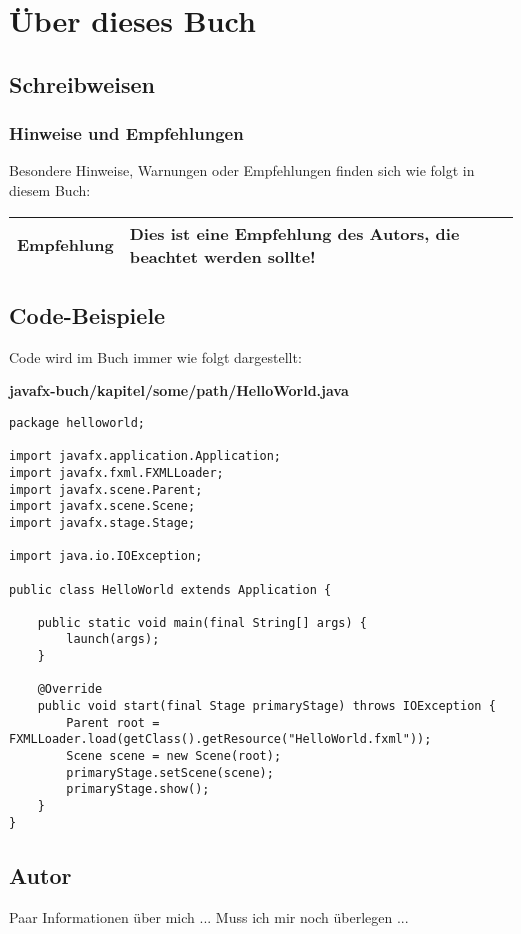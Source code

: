 \section{Über dieses Buch}

\subsection{Schreibweisen}
\subsubsection{Hinweise und Empfehlungen}
Besondere Hinweise, Warnungen oder Empfehlungen finden sich wie folgt in diesem Buch:

\begin{tabular}[h]{|p{2cm}|p{9cm}|}
\hline
\textbf{Empfehlung} & Dies ist eine Empfehlung des Autors, die beachtet werden sollte! \\
\hline
\end{tabular}

\subsection{Code-Beispiele}
Code wird im Buch immer wie folgt dargestellt:

\textbf{javafx-buch/kapitel/some/path/HelloWorld.java}
\begin{lstlisting}
package helloworld;

import javafx.application.Application;
import javafx.fxml.FXMLLoader;
import javafx.scene.Parent;
import javafx.scene.Scene;
import javafx.stage.Stage;

import java.io.IOException;

public class HelloWorld extends Application {

    public static void main(final String[] args) {
        launch(args);
    }

    @Override
    public void start(final Stage primaryStage) throws IOException {
        Parent root = FXMLLoader.load(getClass().getResource("HelloWorld.fxml"));
        Scene scene = new Scene(root);
        primaryStage.setScene(scene);
        primaryStage.show();
    }
}
\end{lstlisting}

\subsection{Autor}
Paar Informationen über mich ... Muss ich mir noch überlegen ...


